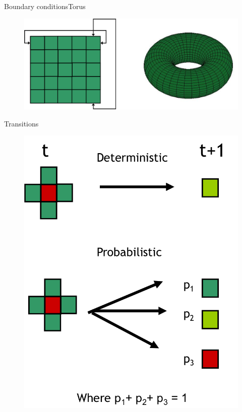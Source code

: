 \documentclass{eecslides}
\begin{document}

	\begin{frame}{Boundary conditions}{Torus}

		\begin{figure}[!t]
			\includegraphics[height=0.55\textheight]{torus}
		\end{figure}

	\end{frame}


	\begin{frame}{Transitions}

		\begin{figure}[!t]
			\includegraphics[height=0.55\textheight]{transitions}
		\end{figure}

	\end{frame}
\end{document}
